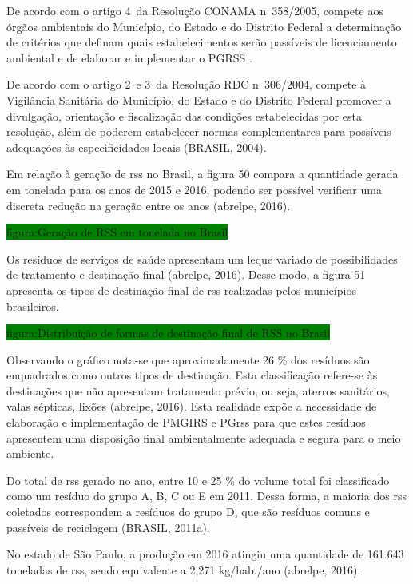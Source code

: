 	De acordo com o artigo 4\textdegree\ da Resolução CONAMA n\textdegree\ 358/2005, compete aos órgãos ambientais do Município, do Estado e do Distrito Federal a determinação de critérios que definam quais estabelecimentos serão passíveis de licenciamento ambiental e de elaborar e implementar o PGRSS \cite{conama:362}.
	
	De acordo com o artigo 2\textdegree\ e 3\textdegree\ da Resolução RDC n\textdegree\ 306/2004, compete à Vigilância Sanitária do Município, do Estado e do Distrito Federal promover a divulgação, orientação e fiscalização das condições estabelecidas por esta resolução, além de poderem estabelecer normas complementares para possíveis adequações às especificidades locais (BRASIL, 2004).

	Em relação à geração de \gls{rss} no Brasil, a figura 50 compara a quantidade gerada em tonelada para os anos de 2015 e 2016, podendo ser possível verificar uma discreta redução na geração entre os anos (\gls{abrelpe}, 2016).
	
	\colorbox{green}{figura:Geração de RSS em tonelada no Brasil}
	
	Os resíduos de serviços de saúde apresentam um leque variado de possibilidades de tratamento e destinação final (\gls{abrelpe}, 2016). Desse modo, a figura 51 apresenta os tipos de destinação final de \gls{rss} realizadas pelos municípios brasileiros.
	
	\colorbox{green}{figura:Distribuição de formas de destinação final de RSS no Brasil}
	
	Observando o gráfico nota-se que aproximadamente 26 \% dos resíduos são enquadrados como outros tipos de destinação. Esta classificação refere-se às destinações que não apresentam tratamento prévio, ou seja, aterros sanitários, valas sépticas, lixões (\gls{abrelpe}, 2016). Esta realidade expõe a necessidade de elaboração e implementação de PMGIRS e PG\gls{rss} para que estes resíduos apresentem uma disposição final ambientalmente adequada e segura para o meio ambiente.

	Do total de \gls{rss} gerado no ano, entre 10 e 25 \% do volume total foi classificado como um resíduo do grupo A, B, C ou E em 2011. Dessa forma, a maioria dos \gls{rss} coletados correspondem a resíduos do grupo D, que são resíduos comuns e passíveis de reciclagem (BRASIL, 2011a).
	
	No estado de São Paulo, a produção em 2016 atingiu uma quantidade de 161.643 toneladas de \gls{rss}, sendo equivalente a 2,271 kg/hab./ano (\gls{abrelpe}, 2016).
	
